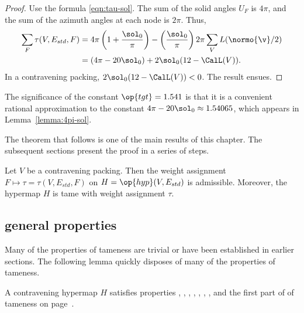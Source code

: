 \begin{proof}
Use the formula \eqref{eqn:tau-sol}.
  The sum of the solid angles $U_F$ is $4\pi$, and the sum of the azimuth
  angles at each node is $2\pi$.
Thus,
\begin{align}\label{eqn:delta0}
  \sum_F \tau (V,E_{std},F) 
  &= 4\pi \left(1 + \dfrac{\sol_0}{\pi}\right) 
- \left(\dfrac{\sol_0}{\pi}\right) 2\pi \sum_{V} L(\normo{\v}/2)\vspace{6pt}\\
&= (4\pi - 20\sol_0) + 2\sol_0 (12 - \CalL(V)).
\end{align}
In a contravening packing, $2\sol_0(12-\CalL(V))<0$.
The result ensues.
\end{proof}

\begin{remark}\label{rem:tgt}
The significance of the constant $\op{tgt}=1.541$ is that it is a
convenient rational approximation to the constant $4\pi -
20\sol_0\approx 1.54065$, which appears in Lemma~\ref{lemma:4pi-sol}.
%
\end{remark}

The theorem that follows is one of the main results of this chapter.  The subsequent
sections present the proof in a series of steps.

\begin{theorem} \label{theorem:contravene}
  Let $V$ be a contravening packing.  Then the weight assignment
  $F\mapsto\tau=\tau(V,E_{std},F)$ on $H=\op{hyp}(V,E_{std})$ is
  admissible.  Moreover, the hypermap $H$ is tame with weight
  assignment $\tau$.
\end{theorem}
%
%
%


\subsection{general properties}
\label{sec:startame}


Many of the properties of tameness are trivial or have been
established in earlier sections.  The following lemma quickly disposes
of many of the properties of tameness.

\begin{lemma}[]\label{lemma:multi}
  A contravening hypermap $H$ satisfies properties ,
  , , , , , , and the first
  part of 
of tameness on page~\pageref{def:tame}.
\end{lemma}

